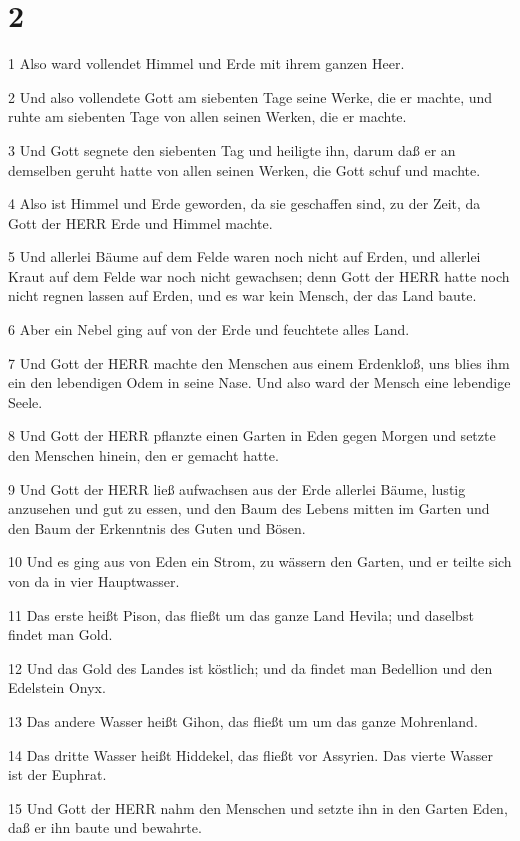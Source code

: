 \chapter{2}

\par 1 Also ward vollendet Himmel und Erde mit ihrem ganzen Heer.
\par 2 Und also vollendete Gott am siebenten Tage seine Werke, die er machte, und ruhte am siebenten Tage von allen seinen Werken, die er machte.
\par 3 Und Gott segnete den siebenten Tag und heiligte ihn, darum daß er an demselben geruht hatte von allen seinen Werken, die Gott schuf und machte.
\par 4 Also ist Himmel und Erde geworden, da sie geschaffen sind, zu der Zeit, da Gott der HERR Erde und Himmel machte.
\par 5 Und allerlei Bäume auf dem Felde waren noch nicht auf Erden, und allerlei Kraut auf dem Felde war noch nicht gewachsen; denn Gott der HERR hatte noch nicht regnen lassen auf Erden, und es war kein Mensch, der das Land baute.
\par 6 Aber ein Nebel ging auf von der Erde und feuchtete alles Land.
\par 7 Und Gott der HERR machte den Menschen aus einem Erdenkloß, uns blies ihm ein den lebendigen Odem in seine Nase. Und also ward der Mensch eine lebendige Seele.
\par 8 Und Gott der HERR pflanzte einen Garten in Eden gegen Morgen und setzte den Menschen hinein, den er gemacht hatte.
\par 9 Und Gott der HERR ließ aufwachsen aus der Erde allerlei Bäume, lustig anzusehen und gut zu essen, und den Baum des Lebens mitten im Garten und den Baum der Erkenntnis des Guten und Bösen.
\par 10 Und es ging aus von Eden ein Strom, zu wässern den Garten, und er teilte sich von da in vier Hauptwasser.
\par 11 Das erste heißt Pison, das fließt um das ganze Land Hevila; und daselbst findet man Gold.
\par 12 Und das Gold des Landes ist köstlich; und da findet man Bedellion und den Edelstein Onyx.
\par 13 Das andere Wasser heißt Gihon, das fließt um um das ganze Mohrenland.
\par 14 Das dritte Wasser heißt Hiddekel, das fließt vor Assyrien. Das vierte Wasser ist der Euphrat.
\par 15 Und Gott der HERR nahm den Menschen und setzte ihn in den Garten Eden, daß er ihn baute und bewahrte.
